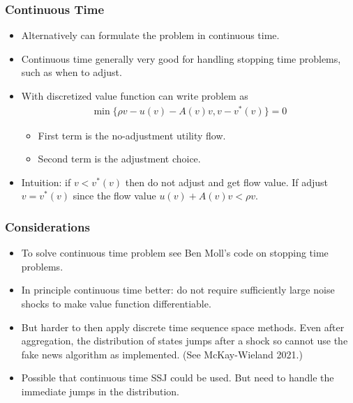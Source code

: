 \documentclass[english,xcolor=svgnames]{beamer}
\begin{document}
\begin{frame}
    \frametitle{Continuous Time}
    \begin{itemize}
        \item Alternatively can formulate the problem in continuous time.
        \item Continuous time generally very good for handling stopping time problems, such as when to adjust.
        \item With discretized value function can write problem as
        \begin{align*}
            \min\{\rho v - u(v) - A(v)v, v - v^{*}(v)\} = 0
        \end{align*}
        \begin{itemize}
            \item First term is the no-adjustment utility flow.
            \item Second term is the adjustment choice.
        \end{itemize}
        \item Intuition: if $v < v^{*}(v)$ then do not adjust and get flow value. If adjust $v = v^{*}(v)$ since the flow value $u(v) + A(v)v < \rho v$.
    \end{itemize}
\end{frame}

\begin{frame}
    \frametitle{Considerations}
    \begin{itemize}
        \item To solve continuous time problem see Ben Moll's code on stopping time problems.
        \item In principle continuous time better: do not require sufficiently large noise shocks to make value function differentiable.
        \item But harder to then apply discrete time sequence space methods. Even after aggregation, the distribution of states jumps after a shock so cannot use the fake news algorithm as implemented. (See McKay-Wieland 2021.)
        \item Possible that continuous time SSJ could be used. But need to handle the immediate jumps in the distribution.
    \end{itemize}
\end{frame}
\end{document}
